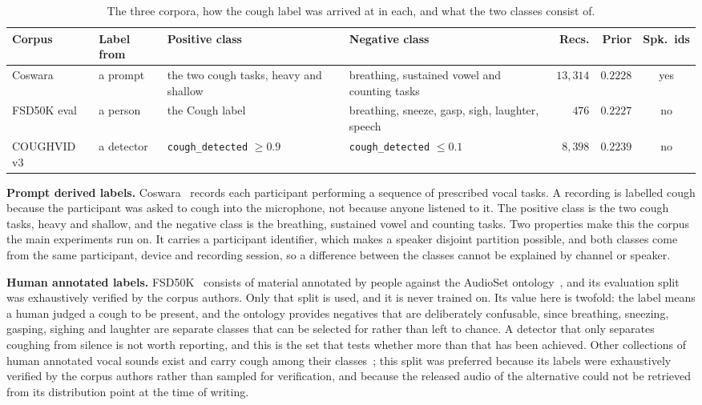 \documentclass[pdflatex,sn-mathphys-num]{sn-jnl}
\begin{document}
\begin{table}[tbp]
\caption{The three corpora, how the cough label was arrived at in each, and what the two classes consist of.}\label{tab:corpora}
\small
\begin{tabular}{@{}lp{}p{}p{}rrc@{}}
\toprule
Corpus & Label from & Positive class & Negative class & Recs. & Prior & Spk.\ ids \\
\midrule
Coswara & a prompt & the two cough tasks, heavy and shallow & breathing, sustained vowel
  and counting tasks & $13{,}314$ & $0.2228$ & yes \\
\addlinespace
FSD50K eval & a person & the \textsf{Cough} label & breathing, sneeze, gasp, sigh,
  laughter, speech & $476$ & $0.2227$ & no \\
\addlinespace
COUGHVID v3 & a detector & \texttt{cough\_detected} $\geq 0.9$ &
  \texttt{cough\_detected} $\leq 0.1$ & $8{,}398$ & $0.2239$ & no \\
\bottomrule
\end{tabular}
\end{table}

\textbf{Prompt derived labels.} Coswara~\cite{coswara2020} records each participant
performing a sequence of prescribed vocal tasks. A recording is labelled cough because
the participant was asked to cough into the microphone, not because anyone listened to
it. The positive class is the two cough tasks, heavy and shallow, and the negative class
is the breathing, sustained vowel and counting tasks. Two properties make this the corpus
the main experiments run on. It carries a participant identifier, which makes a speaker
disjoint partition possible, and both classes come from the same participant, device and
recording session, so a difference between the classes cannot be explained by channel or
speaker.

\textbf{Human annotated labels.} FSD50K~\cite{fsd50k2022} consists of material annotated
by people against the AudioSet ontology~\cite{gemmeke2017}, and its evaluation split was
exhaustively verified by the corpus authors. Only that split is used, and it is never
trained on. Its value here is twofold: the label means a human judged a cough to be
present, and the ontology provides negatives that are deliberately confusable, since
breathing, sneezing, gasping, sighing and laughter are separate classes that can be
selected for rather than left to chance. A detector that only separates coughing from
silence is not worth reporting, and this is the set that tests whether more than that has
been achieved. Other collections of human annotated vocal sounds exist and carry cough
among their classes~\cite{vocalsound2022}; this split was preferred because its labels
were exhaustively verified by the corpus authors rather than sampled for verification, and
because the released audio of the alternative could not be retrieved from its distribution
point at the time of writing.
\end{document}
